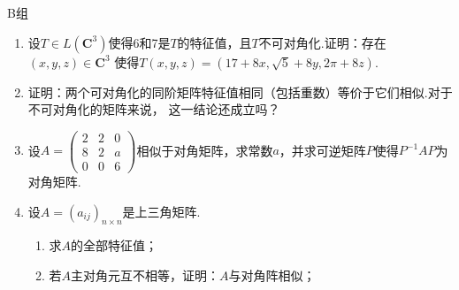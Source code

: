 \centerline{\heiti B组}
\begin{enumerate}
    \item 设$T\in L(\mathbf{C}^3)$使得6和7是$T$的特征值，且$T$不可对角化.证明：存在$(x,y,z)\in\mathbf{C}^3$
	使得$T(x,y,z)=(17+8x,\sqrt{5}+8y,2\pi+8z)$.
    \item 证明：两个可对角化的同阶矩阵特征值相同（包括重数）等价于它们相似.对于不可对角化的矩阵来说，
    这一结论还成立吗？
    \item 设$A=\begin{pmatrix}
        2 & 2 & 0 \\ 8 & 2 & a \\ 0 & 0 & 6
    \end{pmatrix}$相似于对角矩阵，求常数$a$，并求可逆矩阵$P$使得$P^{-1}AP$为对角矩阵.
    \item 设$A=(a_{ij})_{n\times n}$是上三角矩阵.
    \begin{enumerate}[label=(\arabic*)]
        \item 求$A$的全部特征值；

        \item 若$A$主对角元互不相等，证明：$A$与对角阵相似；


\end{enumerate}
\end{enumerate}
